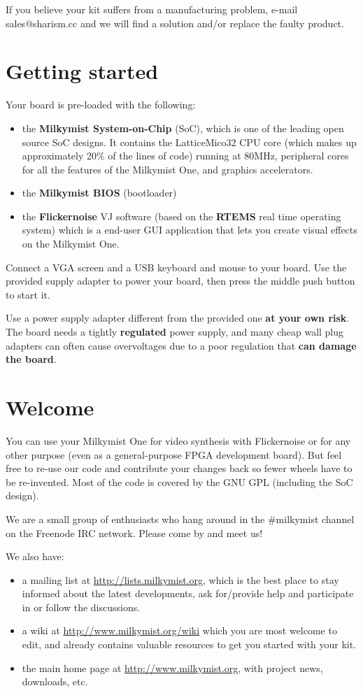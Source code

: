 \documentclass{leaflet}
\begin{document}
If you believe your kit suffers from a manufacturing problem, e-mail sales@sharism.cc and we will find a solution and/or replace the faulty product.

\section{Getting started}
Your board is pre-loaded with the following:
\begin{itemize}
\item the \textbf{Milkymist System-on-Chip} (SoC), which is one of the leading open source SoC designs. It contains the LatticeMico32 CPU core (which makes up approximately 20\% of the lines of code) running at 80MHz, peripheral cores for all the features of the Milkymist One, and graphics accelerators.
\item the \textbf{Milkymist BIOS} (bootloader)
\item the \textbf{Flickernoise} VJ software (based on the \textbf{RTEMS} real time operating system) which is a end-user GUI application that lets you create visual effects on the Milkymist One.
\end{itemize}

Connect a VGA screen and a USB keyboard and mouse to your board. Use the provided supply adapter to power your board, then press the middle push button to start it.

Use a power supply adapter different from the provided one \textbf{at your own risk}. The board needs a tightly \textbf{regulated} power supply, and many cheap wall plug adapters can often cause overvoltages due to a poor regulation that \textbf{can damage the board}.

\section{Welcome}
You can use your Milkymist One for video synthesis with Flickernoise or for any other purpose (even as a general-purpose FPGA development board). But feel free to re-use our code and contribute your changes back so fewer wheels have to be re-invented. Most of the code is covered by the GNU GPL (including the SoC design).

We are a small group of enthusiasts who hang around in the \#milkymist channel on the Freenode IRC network. Please come by and meet us!

We also have:
\begin{itemize}
\item a mailing list at \url{http://lists.milkymist.org}, which is the best place to stay informed about the latest developments, ask for/provide help and participate in or follow the discussions.
\item a wiki at \url{http://www.milkymist.org/wiki} which you are most welcome to edit, and already contains valuable resources to get you started with your kit.
\item the main home page at \url{http://www.milkymist.org}, with project news, downloads, etc.
\end{itemize}
\end{document}

